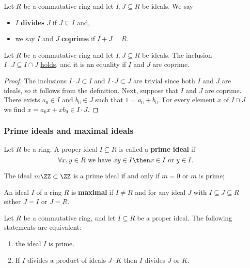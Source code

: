 \documentclass[12pt, a4paper]{article}
\begin{document}
\begin{definition}
    Let \(R\) be a commutative ring and let \(I,J \subseteq R\) be ideals. We say 
    \begin{itemize}
        \item \(I\) \textbf{divides} \(J\) if \(J \subseteq I\) and,
        \item we say \(I\) and \(J\) \textbf{coprime} if \(I+J=R\).
    \end{itemize}
\end{definition}

\begin{mdprop}
    Let \(R\) be a commutative ring and let \(I,J \subseteq R\) be ideals. The inclusion \(I \cdot J \subseteq I \cap J\) \underline{holds}, and it is an equality if \(I\) and \(J\) are coprime.
\end{mdprop}

\begin{proof}
    The inclusions \(I \cdot J \subset I\) and \(I \cdot J \subset J\) are trivial since both \(I\) and \(J\) are ideals, so it follows from the definition. Next, suppose that \(I\) and \(J\) are coprime. There exists \(a_0 \in I\) and \(b_0 \in J\) such that \(1=a_0+b_0\). For every element \(x\) of \(I \cap J\) we find \(x =a_0x+xb_0 \in I\cdot J\).
\end{proof}

\subsubsection{Prime ideals and maximal ideals}

\begin{definition}
    Let \(R\) be a ring. A proper ideal \(I \subsetneq R\) is called a \textbf{prime ideal} if 
    \[\forall x,y \in R \text{ we have } xy\in I \then x\in I \text{ or } y \in I.\]
\end{definition}

\begin{example}
    The ideal \(m\ZZ \subset \ZZ\) is a prime ideal if and only if \(m=0\) or \(m\) is prime;
\end{example}

\begin{definition}
    An ideal \(I\) of a ring \(R\) is \textbf{maximal} if \(I \neq R\) and for any ideal \(J\) with \(I \subseteq J \subseteq R\) either \(J=I\) or \(J=R\).
\end{definition}

\begin{proposition}
    Let \(R\) be a commutative ring, and let \(I \subseteq R\) be a proper ideal. The following statements are equivalent:
    \begin{enumerate}
        \item the ideal \(I\) is prime.
        \item If \(I\) divides a product of ideals \(J \cdot K\) then \(I\) divides \(J\) or \(K\).
    \end{enumerate}
\end{proposition}
\end{document}
